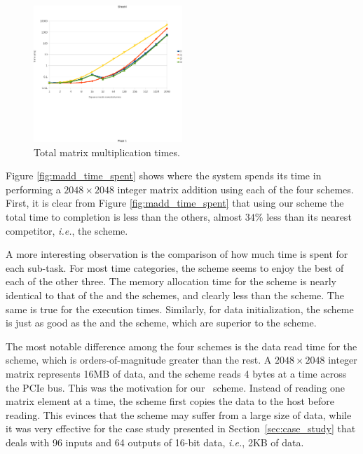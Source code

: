 \begin{figure}[t]
\centering
\includegraphics[width=0.5\textwidth, trim=0.0in 2.0in -0.3in 0.72in,
 clip=true]{eps/mmul_time.eps}
\caption{Total matrix multiplication times.}
\label{fig:mmul_time}
\end{figure}

Figure \ref{fig:madd_time_spent} shows where the system spends its time
in performing a $2048\times2048$ integer matrix addition using each of
the four schemes.
First, it is clear from Figure \ref{fig:madd_time_spent} that using our
{\dmh} scheme the total time to completion is less than the others, 
almost $34\%$ less than its nearest competitor, \textit{i.e.}, the {\hd}
scheme.

A more interesting observation is the comparison of how much
time is spent for each sub-task.
For most time categories, the {\dmh} scheme seems to enjoy the best of
each of the other three.
The memory allocation time for the {\dmh} scheme is nearly
identical to that of the {\hd} and the {\dm} schemes, and clearly less
than the {\hp} scheme.
The same is true for the execution times. 
Similarly, for data initialization, the {\dmh} scheme is just as good as
the {\hp} and the {\dm} scheme, which are superior to the {\hd} scheme.

The most notable difference among the four schemes is the data read time
for the {\dm} scheme, which is orders-of-magnitude greater than the
rest.
A $2048\times2048$ integer matrix represents 16MB of data, and the {\dm}
scheme reads 4 bytes at a time across the PCIe bus.
This was the motivation for our \dmh\ scheme.
Instead of reading one matrix element at a time, the {\dmh} scheme first
copies the data to the host before reading.
This evinces that the {\dm} scheme may suffer from a large size of data,
while it was very effective for the case study presented in
Section~\ref{sec:case_study} that deals with 96 inputs and 64 outputs of
16-bit data, \textit{i.e.}, 2KB of data.

